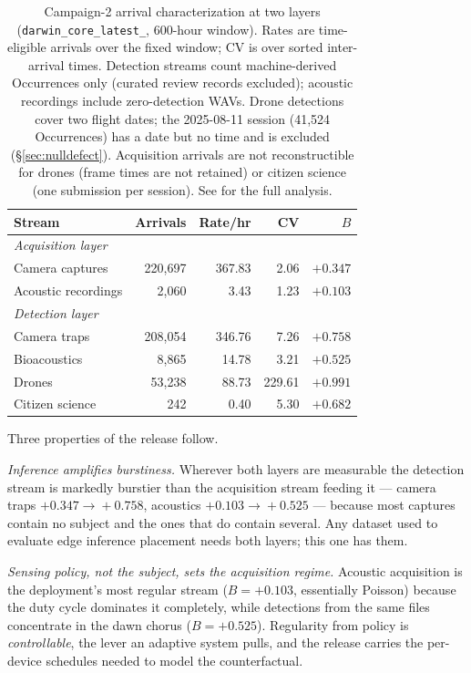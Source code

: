 \documentclass[sigconf]{acmart}
\begin{document}
\begin{table}[t]
\caption{Campaign-2 arrival characterization at two layers
(\texttt{darwin\_core\_\allowbreak latest\_}, 600-hour window).
Rates are time-eligible arrivals over the fixed window; CV is over
sorted inter-arrival times. Detection streams count machine-derived
Occurrences only (curated review records excluded); acoustic
recordings include zero-detection WAVs. Drone detections cover
two flight dates; the 2025-08-11 session (41{,}524 Occurrences) has a
date but no time and is excluded (\S\ref{sec:nulldefect}).
Acquisition arrivals are not reconstructible for drones (frame times are
not retained) or citizen science (one submission per session). See
\cite{smartwilds_workload} for the full analysis.}
\label{tab:arrivals}
\small
\begin{tabular}{lrrrr}
\toprule
\textbf{Stream} & \textbf{Arrivals} & \textbf{Rate/hr} & \textbf{CV} & \textbf{$B$} \\
\midrule
\multicolumn{5}{l}{\emph{Acquisition layer}} \\
Camera captures & 220{,}697 & 367.83 & 2.06 & $+0.347$ \\
Acoustic recordings & 2{,}060 & 3.43 & 1.23 & $+0.103$ \\
\midrule
\multicolumn{5}{l}{\emph{Detection layer}} \\
Camera traps & 208{,}054 & 346.76 & 7.26 & $+0.758$ \\
Bioacoustics & 8{,}865 & 14.78 & 3.21 & $+0.525$ \\
Drones & 53{,}238 & 88.73 & 229.61 & $+0.991$ \\
Citizen science & 242 & 0.40 & 5.30 & $+0.682$ \\
\bottomrule
\end{tabular}
\end{table}

Three properties of the release follow.

\emph{Inference amplifies burstiness.} Wherever both layers are
measurable the detection stream is markedly burstier than the
acquisition stream feeding it --- camera traps $+0.347\!\to\!+0.758$,
acoustics $+0.103\!\to\!+0.525$ --- because most captures contain no
subject and the ones that do contain several. Any dataset used to
evaluate edge inference placement needs both layers; this one has them.

\emph{Sensing policy, not the subject, sets the acquisition regime.}
Acoustic acquisition is the deployment's most regular stream
($B{=}+0.103$, essentially Poisson) because the duty cycle dominates it
completely, while detections from the same files concentrate in the dawn
chorus ($B{=}+0.525$). Regularity from policy is \emph{controllable},
the lever an adaptive system pulls, and the release carries the
per-device schedules needed to model the counterfactual.
\end{document}
